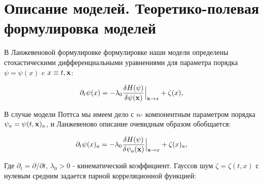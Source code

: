 \documentclass []{rusthesis} %
\def\x{{\bf x}}
\def\bfx{{\bf x}}
\begin{document}



\chapter{Описание моделей. Теоретико-полевая формулировка моделей}
\label{sec:QFT}

В Ланжевеновой формулировке формулировке наши модели определены стохастическими  дифференциальными уравнениями для параметра порядка $\psi = \psi(x)$ c $x \equiv {t,\bf x}$:


\begin{equation}
\partial_t\psi(x) =-\lambda_0 \Bigr.\frac{\delta H(\psi)}{\delta \psi (\bfx)}\Bigr|_{\x \rightarrow x} + \zeta(x),
\label{eq:Langeven}	
\end{equation}


В случае модели Поттса мы имеем дело с $n$- компонентным параметром порядка $\psi_a = \psi(t,{\bf x})_a$, и Ланжевеново описание очевидным
образом обобщается:

\begin{equation}
\partial_t\psi(x)_a =-\lambda_0 \Bigr.\frac{\delta H(\psi)}{\delta \psi_a (\bfx)}\Bigr|_{\x \rightarrow x} + \zeta(x)_a,
\label{eq:Langeven_potts}	
\end{equation}

Где $\partial_t=\partial/\partial t$, $\lambda_0>0$ - кинематический коэффициент. Гауссов шум $\zeta=\zeta(t,x)$
с нулевым средним задается парной корреляционной функцией:
\end{document}
